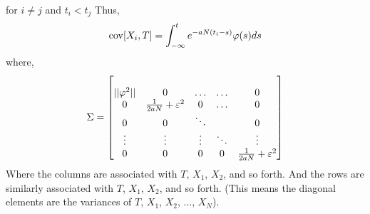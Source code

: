 \documentclass[../../../Master/AppliedStochastics.tex]{subfiles}
\begin{document}
for $i\neq j$ and $t_{i}<t_{j}$ 
Thus, 
$$\begin{aligned}
\cov[X_{i}, T] = \int_{-\infty}^{t} e^{-aN(t_{i}-s)}\varphi(s) ds 
\end{aligned}$$
where, 
$$\begin{aligned}
\Sigma = 
\begin{bmatrix}
&  &  &  &  \\
\vert\vert\varphi^2\vert\vert & 0 & \dotso & \dotso & 0 \\
0 & \frac{1}{2aN}+\varepsilon^2 & 0 & \dotso & 0 \\
0 & 0 & \ddots & \hfill & 0\\
\vdots & \vdots & \vdots & \ddots & \vdots \\
0 & 0 & 0 & 0 & \frac{1}{2aN}+\varepsilon^2
\end{bmatrix}
\end{aligned}$$
Where the columns are associated with $T$, $X_{1}$, $X_{2}$, and so forth. 
And the rows are similarly associated with $T$, $X_{1}$, $X_{2}$, and so forth. 
(This means the diagonal elements are the variances of $T$, $X_{1}$, $X_{2}$, $\dotso$, $X_N$).
%
\end{document}

